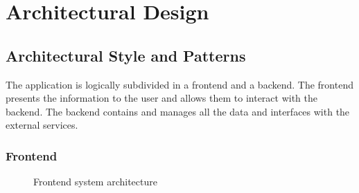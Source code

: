 \documentclass{article}
\begin{document}
\section{Architectural Design}
\subsection{Architectural Style and Patterns}
The application is logically subdivided in a frontend and a backend.
The frontend presents the information to the user and allows them to interact
with the backend. The backend contains and manages all the data and interfaces
with the external services.
\subsubsection{Frontend}

\begin{figure}[H]
	\noindent
	\caption{Frontend system architecture} 
\end{figure}
\end{document}
